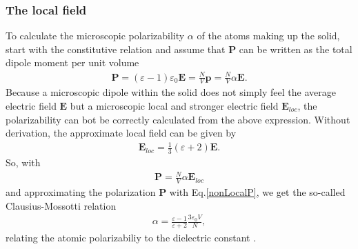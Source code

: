 \subsubsection{The local field}
To calculate the microscopic polarizability $\alpha$ of the atoms making up the solid, start with
the constitutive relation and assume that $\boldsymbol P$ can be written as the total dipole moment 
per unit volume
\begin{align}
   \boldsymbol P = (\varepsilon - 1 ) \varepsilon_0 \boldsymbol E = \frac{N}{V} \boldsymbol p = \frac{N}{V}\alpha \boldsymbol E.
   \label{nonLocalP}
\end{align}
Because a microscopic dipole within the solid does not simply feel the average electric field 
$\boldsymbol E$ but a microscopic local and stronger electric field $\boldsymbol E_{loc}$, the polarizability
can bot be correctly calculated from the above expression.
Without derivation, the approximate local field can be given by
\begin{align}
   \boldsymbol E_{loc} = \frac{1}{3}(\varepsilon + 2) \boldsymbol E.
\end{align}
So, with
\begin{align}
   \boldsymbol P = \frac{N}{V}\alpha \boldsymbol E_{loc}
\end{align}
and approximating the polarization $\boldsymbol P$ with Eq.\eqref{nonLocalP}, 
we get the so-called Clausius-Mossotti relation
\begin{align}
   \alpha = \frac{\varepsilon - 1}{\varepsilon + 2} \frac{3 \varepsilon_0 V}{N},
\end{align}
relating the atomic polarizabiliy to the dielectric constant \cite[p.~165-166]{Hofmann}.

